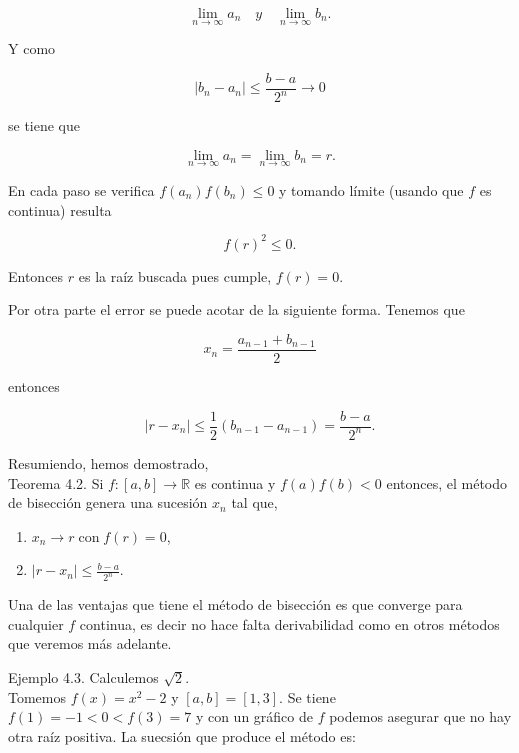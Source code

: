 \documentclass[10pt]{article}
\begin{document}
$$
\lim _{n \rightarrow \infty} a_{n} \quad y \quad \lim _{n \rightarrow \infty} b_{n} .
$$

Y como

$$
\left|b_{n}-a_{n}\right| \leq \frac{b-a}{2^{n}} \rightarrow 0
$$

se tiene que

$$
\lim _{n \rightarrow \infty} a_{n}=\lim _{n \rightarrow \infty} b_{n}=r .
$$

En cada paso se verifica $f\left(a_{n}\right) f\left(b_{n}\right) \leq 0$ y tomando límite (usando que $f$ es continua) resulta

$$
f(r)^{2} \leq 0 .
$$

Entonces $r$ es la raíz buscada pues cumple, $f(r)=0$.

Por otra parte el error se puede acotar de la siguiente forma. Tenemos que

$$
x_{n}=\frac{a_{n-1}+b_{n-1}}{2}
$$

entonces

$$
\left|r-x_{n}\right| \leq \frac{1}{2}\left(b_{n-1}-a_{n-1}\right)=\frac{b-a}{2^{n}} .
$$

Resumiendo, hemos demostrado,\\
Teorema 4.2. Si $f:[a, b] \rightarrow \mathbb{R}$ es continua y $f(a) f(b)<0$ entonces, el método de bisección genera una sucesión $x_{n}$ tal que,

\begin{enumerate}
  \item $x_{n} \rightarrow r \operatorname{con} f(r)=0$,
  \item $\left|r-x_{n}\right| \leq \frac{b-a}{2^{n}}$.
\end{enumerate}

Una de las ventajas que tiene el método de bisección es que converge para cualquier $f$ continua, es decir no hace falta derivabilidad como en otros métodos que veremos más adelante.

Ejemplo 4.3. Calculemos $\sqrt{2}$.\\
Tomemos $f(x)=x^{2}-2$ y $[a, b]=[1,3]$. Se tiene $f(1)=-1<0<f(3)=7$ y con un gráfico de $f$ podemos asegurar que no hay otra raíz positiva. La suecsión que produce el método es:
\end{document}
